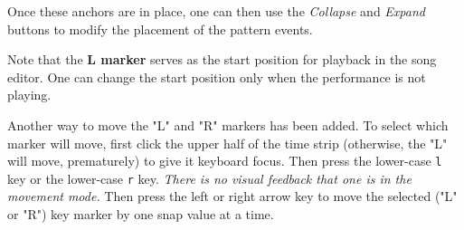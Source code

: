    Once these anchors are in place, one can then use
	the \textsl{Collapse} and \textsl{Expand} buttons to modify the
   placement of the pattern events.

   Note that the \textbf{L marker} serves as the start position for playback
   in the song editor.  One can change the start position only when the
   performance is not playing.

   Another way to move the "L" and "R" markers has been added.
   To select which marker will move, first click the upper half of the time
   strip (otherwise, the "L" will move, prematurely) to give it keyboard focus.
   Then press the lower-case
   \texttt{l} key or the lower-case
   \texttt{r} key.
   \textsl{There is no visual feedback that one is in the movement mode.}
   Then press the left or right arrow key to move the selected ("L" or "R")
   key marker by one snap value at a time.

\begin{comment}

\subsection{Song Editor / Bottom Panel}
\label{subsec:song_editor_bottom}

   The bottom panel is simple, consisting of a stock horizontal scroll bar
   and a small button, called the \textbf{Grow} button, labelled with a
   "\textbf{$>$}".

   \index{grow button}
   \index{song editor!grow}
   The \textbf{Grow} button adds to the number of measures that exist
   in the song editor. The visual effect is very subtle, resulting only
   in a small change in the thumb of the horizontal scroll-bar, unless one
   is at the right end of the piano roll.  Then, one can see the added
   measures.  Usually about 128 at a time are added, but this depends on the
   value of PPQN in force.

\end{comment}

